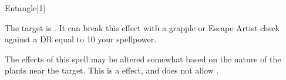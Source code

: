 \begin{spellsection}{Entangle}[1]
    \begin{spellheader}
    \end{spellheader}
    \begin{spellcontent}
        \begin{spelltargetinginfo}
        \end{spelltargetinginfo}
        \begin{spelleffects}
            \spelleffect The target is \entangled.
            It can break this effect with a grapple or Escape Artist check against a DR equal to 10 \add your spellpower.
            \spelldur \durbrief
        \end{spelleffects}
    \end{spellcontent}
    \begin{spellfooter}
        \spellnotes The effects of this spell may be altered somewhat based on the nature of the plants near the target.
        This is a  effect, and does not allow .
        \miscastrandom
    \end{spellfooter}
    \begin{spellaugments}
    \end{spellaugments}
\end{spellsection}


